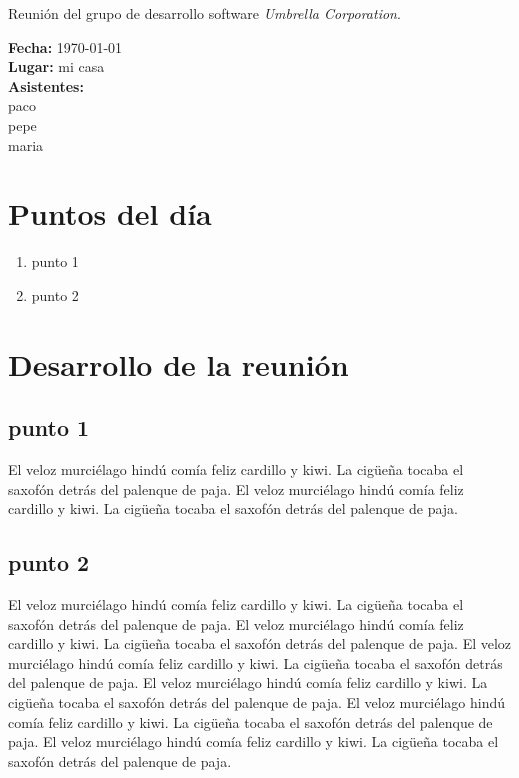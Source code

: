 \documentclass[a4paper,11pt,oneside]{article}
\begin{document}
\pagestyle{fancy}


\begin{center}
Reunión del grupo de desarrollo software \textit{Umbrella Corporation}.
\end{center}
\textbf{Fecha:} \today\\
\textbf{Lugar:} mi casa\\
\textbf{Asistentes:}\\
\hspace*{1cm}paco\\
\hspace*{1cm}pepe\\
\hspace*{1cm}maria


\section*{Puntos del día}

\begin{enumerate}
\item punto 1
\item punto 2
\end{enumerate}


\section*{Desarrollo de la reunión}

\subsection*{punto 1}

El veloz murciélago hindú comía feliz cardillo y kiwi. La cigüeña tocaba el
saxofón detrás del palenque de paja.
El veloz murciélago hindú comía feliz cardillo y kiwi. La cigüeña tocaba el
saxofón detrás del palenque de paja.

\subsection*{punto 2}
El veloz murciélago hindú comía feliz cardillo y kiwi. La cigüeña tocaba el
saxofón detrás del palenque de paja.
El veloz murciélago hindú comía feliz cardillo y kiwi. La cigüeña tocaba el
saxofón detrás del palenque de paja.
El veloz murciélago hindú comía feliz cardillo y kiwi. La cigüeña tocaba el
saxofón detrás del palenque de paja.
El veloz murciélago hindú comía feliz cardillo y kiwi. La cigüeña tocaba el
saxofón detrás del palenque de paja.
El veloz murciélago hindú comía feliz cardillo y kiwi. La cigüeña tocaba el
saxofón detrás del palenque de paja.
El veloz murciélago hindú comía feliz cardillo y kiwi. La cigüeña tocaba el
saxofón detrás del palenque de paja.
\end{document}
